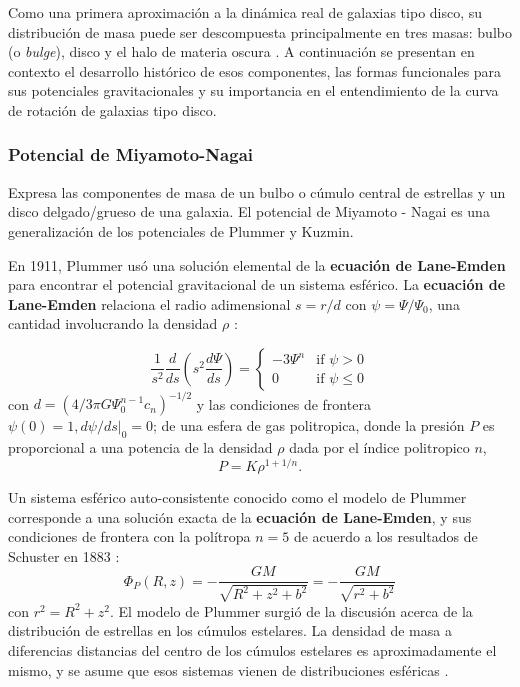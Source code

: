 Como una primera aproximación a la dinámica real de galaxias tipo disco, su distribución de masa puede ser descompuesta principalmente en tres masas: bulbo (o \emph{bulge}), disco y el halo de materia oscura \cite{S16}. A continuación se presentan en contexto el desarrollo histórico de esos componentes, las formas funcionales para sus potenciales gravitacionales y su importancia en el entendimiento de la curva de rotación de galaxias tipo disco.

\subsubsection{Potencial de Miyamoto-Nagai}
Expresa las componentes de masa de un bulbo o cúmulo central de estrellas y un disco delgado/grueso de una galaxia. El potencial de Miyamoto - Nagai es una generalización de los potenciales de Plummer y Kuzmin.

En 1911, Plummer usó una solución elemental de la \textbf{ecuación de Lane-Emden} para encontrar el potencial gravitacional de un sistema esférico. La \textbf{ecuación de Lane-Emden} relaciona el radio adimensional $s=r/d$ con $\psi = \Psi/\Psi_0$, una cantidad involucrando la densidad $\rho$ \cite{BT}:

\begin{equation}
\label{Lane_Emden}
 \frac{1}{s^2} \frac{d}{ds} \left ( s^2 \frac{d \Psi}{ds} \right ) = \left\{
	\begin{array}{ll}
		-3\Psi^n  & \mbox{if } \psi > 0 \\
		0 & \mbox{if } \psi \leq 0
	\end{array}
\right.
\end{equation}
con
$d=(4/3 \pi G \Psi_0^{n-1}c_n)^{-1/2}$ y las condiciones de frontera $\psi(0) = 1, d\psi/ds|_0 = 0$; de una esfera de gas politropica, donde la presión $P$ es proporcional a una potencia de la densidad $\rho$ dada por el índice politropico $n$, 
 $$ P=K \rho^{1+1/n}. $$

Un sistema esférico auto-consistente conocido como el modelo de Plummer corresponde a una solución exacta de la \textbf{ecuación de Lane-Emden}, y sus condiciones de frontera con la polítropa $n=5$ de acuerdo a los resultados de Schuster en 1883 \cite{Miyamoto75, BT}:
$$\Phi_P (R,z) = - \frac{GM}{\sqrt{R^2+z^2+b^2} } = - \frac{GM}{\sqrt{r^2+b^2} }$$
con $r^2 = R^2+z^2 .$ El modelo de Plummer surgió de la discusión acerca de la distribución de estrellas en los cúmulos estelares. La densidad de masa a diferencias distancias del centro de los cúmulos estelares es aproximadamente el mismo, y se asume que esos sistemas vienen de distribuciones esféricas \cite{Plummer11}.\\

